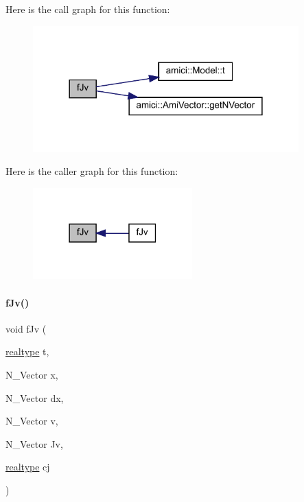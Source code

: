 Here is the call graph for this function\+:
\nopagebreak
\begin{figure}[H]
\begin{center}
\leavevmode
\includegraphics[width=290pt]{classamici_1_1_model___d_a_e_a1a0549510cbe20e4d3c28bf77fc722ed_cgraph}
\end{center}
\end{figure}
Here is the caller graph for this function\+:
\nopagebreak
\begin{figure}[H]
\begin{center}
\leavevmode
\includegraphics[width=174pt]{classamici_1_1_model___d_a_e_a1a0549510cbe20e4d3c28bf77fc722ed_icgraph}
\end{center}
\end{figure}
\mbox{\label{classamici_1_1_model___d_a_e_a7a3565abc7cb0372df38aec43e764275}} 
\paragraph{\texorpdfstring{f\+Jv()}{fJv()}\hspace{0.1cm}{\footnotesize\ttfamily [2/3]}}
{\footnotesize\ttfamily void f\+Jv (\begin{DoxyParamCaption}\item[{\mbox{\hyperlink{namespaceamici_a1bdce28051d6a53868f7ccbf5f2c14a3}{realtype}}}]{t,  }\item[{N\+\_\+\+Vector}]{x,  }\item[{N\+\_\+\+Vector}]{dx,  }\item[{N\+\_\+\+Vector}]{v,  }\item[{N\+\_\+\+Vector}]{Jv,  }\item[{\mbox{\hyperlink{namespaceamici_a1bdce28051d6a53868f7ccbf5f2c14a3}{realtype}}}]{cj }\end{DoxyParamCaption})}

